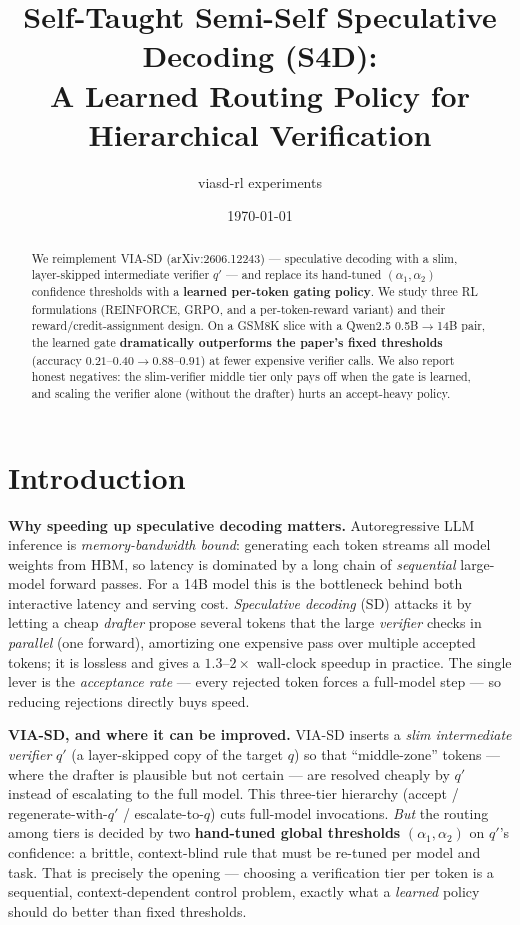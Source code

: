 \documentclass[11pt]{article}
\title{\textbf{Self-Taught Semi-Self Speculative Decoding (S4D):\\ A Learned Routing Policy for Hierarchical Verification}}
\author{viasd-rl experiments}
\date{\today}
\begin{document}
\maketitle

\begin{abstract}
We reimplement VIA-SD (arXiv:2606.12243) --- speculative decoding with a slim,
layer-skipped intermediate verifier $q'$ --- and replace its hand-tuned
$(\alpha_1,\alpha_2)$ confidence thresholds with a \textbf{learned per-token gating
policy}. We study three RL formulations (REINFORCE, GRPO, and a per-token-reward
variant) and their reward/credit-assignment design. On a GSM8K slice with a Qwen2.5
\mbox{0.5B$\to$14B} pair, the learned gate \textbf{dramatically outperforms the paper's fixed
thresholds} (accuracy $0.21$--$0.40\to0.88$--$0.91$) at fewer expensive verifier calls.
We also report honest negatives: the slim-verifier middle tier only pays off when the gate is
learned, and scaling the verifier alone (without the drafter) hurts an accept-heavy policy.
\end{abstract}

\section{Introduction}
\textbf{Why speeding up speculative decoding matters.} Autoregressive LLM inference is
\emph{memory-bandwidth bound}: generating each token streams all model weights from HBM, so latency
is dominated by a long chain of \emph{sequential} large-model forward passes. For a 14B model this is
the bottleneck behind both interactive latency and serving cost. \emph{Speculative decoding} (SD)
attacks it by letting a cheap \emph{drafter} propose several tokens that the large \emph{verifier}
checks in \emph{parallel} (one forward), amortizing one expensive pass over multiple accepted
tokens; it is lossless and gives a $1.3$--$2\times$ wall-clock speedup in practice. The single lever
is the \emph{acceptance rate} --- every rejected token forces a full-model step --- so reducing
rejections directly buys speed.

\textbf{VIA-SD, and where it can be improved.} VIA-SD inserts a \emph{slim intermediate verifier}
$q'$ (a layer-skipped copy of the target $q$) so that ``middle-zone'' tokens --- where the drafter is
plausible but not certain --- are resolved cheaply by $q'$ instead of escalating to the full model.
This three-tier hierarchy (accept / regenerate-with-$q'$ / escalate-to-$q$) cuts full-model
invocations. \emph{But} the routing among tiers is decided by two \textbf{hand-tuned global
thresholds} $(\alpha_1,\alpha_2)$ on $q'$'s confidence: a brittle, context-blind rule that must be
re-tuned per model and task. That is precisely the opening --- choosing a verification tier per token
is a sequential, context-dependent control problem, exactly what a \emph{learned} policy should do
better than fixed thresholds.
\end{document}
